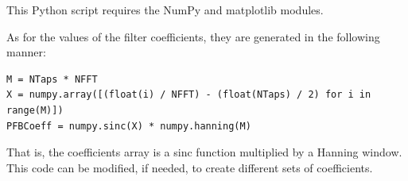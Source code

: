 \documentclass[11pt]{article} %
\begin{document}
This Python script requires the NumPy and matplotlib modules.

As for the values of the filter coefficients, they are generated in the
following manner:

\begin{verbatim}
M = NTaps * NFFT
X = numpy.array([(float(i) / NFFT) - (float(NTaps) / 2) for i in range(M)])
PFBCoeff = numpy.sinc(X) * numpy.hanning(M)
\end{verbatim}

That is, the coefficients array is a sinc function multiplied by a Hanning
window. This code can be modified, if needed, to create different sets of
coefficients.
\end{document}
